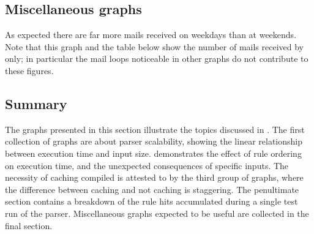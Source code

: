 

\clearpage



\subsection{Miscellaneous graphs}

\label{Miscellaneous graphs}


As expected there are far more mails received on weekdays than at weekends.
Note that this graph and the table below show the number of mails received
by \SMTP{} only; in particular the mail loops noticeable in other graphs
do not contribute to these figures.



\clearpage

\subsection{Summary}

The graphs presented in this section illustrate the topics discussed in
.  The first collection of graphs are about
parser scalability, showing the linear relationship between execution time
and input size.   demonstrates the effect
of rule ordering on execution time, and the unexpected consequences of
specific inputs.  The necessity of caching compiled \regexes{} is attested
to by the third group of graphs, where the difference between caching and
not caching is staggering.  The penultimate section contains a breakdown of
the rule hits accumulated during a single test run of the parser.
Miscellaneous graphs expected to be useful are collected in the final
section.  
